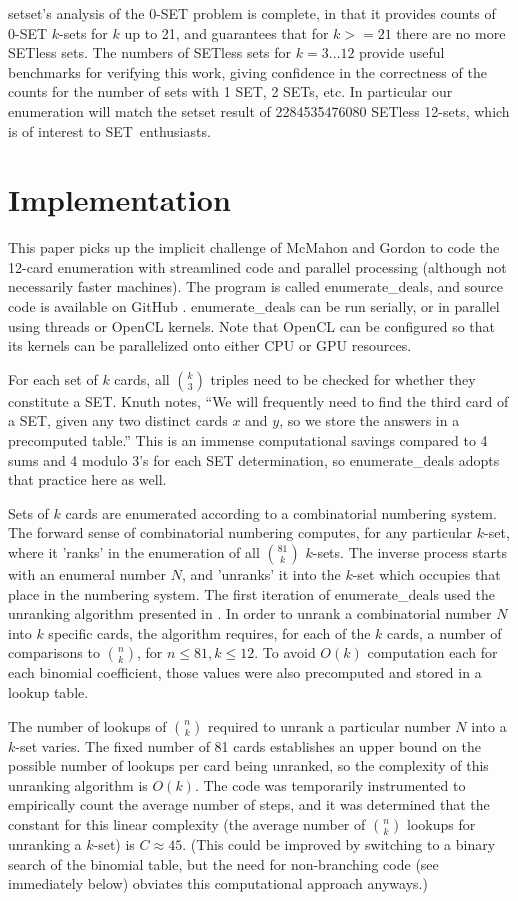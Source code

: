 \documentclass[10pt]{amsart}
\newcommand{\SETb}{SET\texttrademark\ } %
\newcommand{\SETSET}{{\sc setset}}
\newcommand{\SETSETb}{{\sc setset }}
\newcommand{\ED}{{\sc enumerate\_deals}}
\newcommand{\EDb}{{\sc enumerate\_deals }}
\begin{document}
\SETSET's analysis of the 0-SET problem is complete, in that it provides counts
of 0-SET $k$-sets for $k$ up to 21, and \cite{MAXCAP} guarantees that for
$k>=21$ there are no more SETless sets. The numbers of SETless sets for
$k=3\ldots 12$ provide useful benchmarks for verifying this work, giving
confidence in the correctness of the counts for the number of sets with 1 SET, 2
SETs, etc. In particular our enumeration will match the \SETSETb result of
2284535476080 SETless 12-sets, which is of interest to \SETb enthusiasts.


\section{Implementation}
This paper picks up the implicit challenge of McMahon and Gordon to code the
12-card enumeration with streamlined code and parallel processing (although not
necessarily faster machines). The program is called \ED, and source code is
available on GitHub \cite{ME}. \EDb can be run serially, or in parallel using
threads or OpenCL \cite{OPENCL} kernels. Note that OpenCL can be configured so
that its kernels can be parallelized onto either CPU or GPU resources.

For each set of $k$ cards, all $\binom{k}{3}$ triples need to be checked for
whether they constitute a SET. Knuth notes, ``We will frequently need to find
the third card of a SET, given any two distinct cards $x$ and $y$, so we store
the answers in a precomputed table.''  This is an immense computational savings
compared to 4 sums and 4 modulo 3's for each SET determination, so \EDb adopts
that practice here as well.

Sets of $k$ cards are enumerated according to a combinatorial numbering
system. The forward sense of combinatorial numbering computes, for any
particular $k$-set, where it 'ranks' in the enumeration of all $\binom{81}{k}$
$k$-sets. The inverse process starts with an enumeral number $N$, and 'unranks'
it into the $k$-set which occupies that place in the numbering system. The first
iteration of \EDb used the unranking algorithm presented in \cite{WIKI}. In
order to unrank a combinatorial number $N$ into $k$ specific cards, the
algorithm requires, for each of the $k$ cards, a number of comparisons to
$\binom{n}{k}$, for $n\le 81, k\le 12$. To avoid $O(k)$ computation each for
each binomial coefficient, those values were also precomputed and stored in a
lookup table.

The number of lookups of $\binom{n}{k}$ required to unrank a particular number
$N$ into a $k$-set varies. The fixed number of 81 cards establishes an upper
bound on the possible number of lookups per card being unranked, so the
complexity of this unranking algorithm is $O(k)$. The code was temporarily
instrumented to empirically count the average number of steps, and it was
determined that the constant for this linear complexity (the average number of
$\binom{n}{k}$ lookups for unranking a $k$-set) is $C\approx 45$. (This could be
improved by switching to a binary search of the binomial table, but the need for
non-branching code (see immediately below) obviates this computational approach
anyways.)
\end{document}
